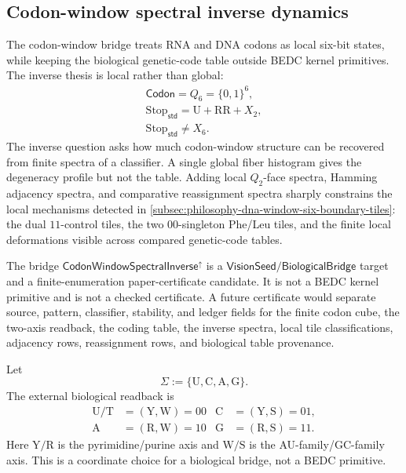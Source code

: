 \subsection{Codon-window spectral inverse dynamics}
\label{subsec:philosophy-codon-window-inverse-reconstruction}

The codon-window bridge treats RNA and DNA codons as local six-bit
states, while keeping the biological genetic-code table outside BEDC
kernel primitives. The inverse thesis is local rather than global:
$$
\begin{gathered}
  \mathsf{Codon}=Q_{6}=\{0,1\}^{6},\\
  \mathrm{Stop}_{\mathsf{std}}=\mathrm{U}+\mathrm{RR}+X_{2},\\
  \mathrm{Stop}_{\mathsf{std}}\neq X_{6}.
\end{gathered}
$$
The inverse question asks how much codon-window structure can be
recovered from finite spectra of a classifier. A single global fiber
histogram gives the degeneracy profile but not the table. Adding local
$Q_{2}$-face spectra, Hamming adjacency spectra, and comparative
reassignment spectra sharply constrains the local mechanisms detected in
\autoref{subsec:philosophy-dna-window-six-boundary-tiles}: the dual
$11$-control tiles, the two $00$-singleton Phe/Leu tiles, and the finite
local deformations visible across compared genetic-code tables.

\begin{definition}
\label{def:philosophy-codon-window-inverse-bridge-status}
The bridge
$\mathsf{CodonWindowSpectralInverse}^{\uparrow}$ is a
$\mathsf{VisionSeed}/\mathsf{BiologicalBridge}$ target and a
finite-enumeration paper-certificate candidate. It is not a BEDC kernel
primitive and is not a checked certificate. A future certificate would
separate source, pattern, classifier, stability, and ledger fields for
the finite codon cube, the two-axis readback, the coding table, the
inverse spectra, local tile classifications, adjacency rows,
reassignment rows, and biological table provenance.
\end{definition}

\begin{definition}
\label{def:philosophy-spectral-inverse-two-axis-atlas}
Let
$$
  \Sigma:=\{\mathrm{U},\mathrm{C},\mathrm{A},\mathrm{G}\}.
$$
The external biological readback is
$$
\begin{aligned}
  \mathrm{U}/\mathrm{T}&=(\mathrm{Y},\mathrm{W})=00&
  \mathrm{C}&=(\mathrm{Y},\mathrm{S})=01,\\
  \mathrm{A}&=(\mathrm{R},\mathrm{W})=10&
  \mathrm{G}&=(\mathrm{R},\mathrm{S})=11.
\end{aligned}
$$
Here $\mathrm{Y}/\mathrm{R}$ is the pyrimidine/purine axis and
$\mathrm{W}/\mathrm{S}$ is the AU-family/GC-family axis. This is a
coordinate choice for a biological bridge, not a BEDC primitive.
\end{definition}


